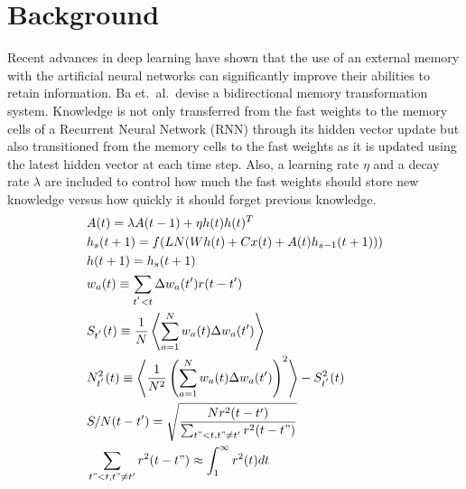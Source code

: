 \documentclass[10pt,letterpaper]{article}
\begin{document}
\section{Background}
Recent advances in deep learning \cite{dnc, fw} have shown that the use of an external memory with the artificial neural networks can significantly improve their abilities to retain information.
Ba et.\ al.\ devise a bidirectional memory transformation system.
Knowledge is not only transferred from the fast weights to the memory cells of a Recurrent Neural Network (RNN) through its hidden vector update but also transitioned from the memory cells to the fast weights as it is updated using the latest hidden vector at each time step.
Also, a learning rate $\eta$ and a decay rate $\lambda$ are included to control how much the fast weights should store new knowledge versus how quickly it should forget previous knowledge.
\begin{align}
    &A(t) = \lambda A(t-1) + \eta h(t) h(t)^T
    \label{eq:external_memory} \\
    &h_s(t+1) = f(LN(Wh(t) + Cx(t) + A(t)h_{s-1}(t+1)))
    \label{eq:hidden_update} \\
    &h(t+1) = h_s(t+1) \label{eq:hidden_assign} \\
    &w_a(t) \equiv \sum_{t^{'} < t} \Delta w_a(t') r(t-t')
    \label{eq:memory} \\
    &S_{t^{'}}(t) \equiv \frac{1}{N}\left<\sum_{a=1}^N w_a(t)\Delta w_a(t') \right>
    \label{eq:signal} \\
    &N^2_{t^{'}}(t) \equiv \left<\frac{1}{N^2}\left(\sum_{a=1}^N w_a(t)\Delta w_a(t') \right)^2 \right> - S^2_{t^{'}}(t)
    \label{eq:variance} \\
    &S / N(t - t') = \sqrt{\frac{N r^2(t - t')}{\sum_{t" < t, t" \neq t'} r^2(t- t")}}
    \label{eq:snr}\\
    &\sum_{t" < t, t" \neq t'} r^2(t- t") \approx \int_{1}^{\infty} r^2(t) dt 
    \label{eq:decay}
\end{align}
\end{document}
